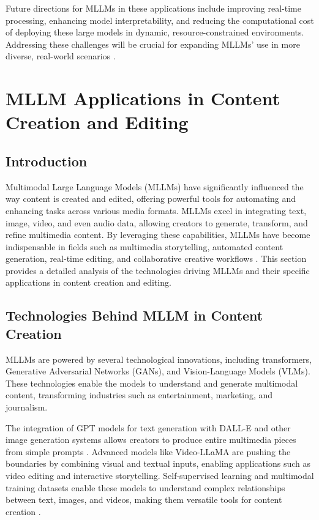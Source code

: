 \documentclass{article}
\begin{document}
Future directions for MLLMs in these applications include improving real-time processing, enhancing model interpretability, and reducing the computational cost of deploying these large models in dynamic, resource-constrained environments. Addressing these challenges will be crucial for expanding MLLMs' use in more diverse, real-world scenarios \cite{vs2024yang,vs2023chen}.

\section{MLLM Applications in Content Creation and Editing}

\subsection{Introduction}

Multimodal Large Language Models (MLLMs) have significantly influenced the way content is created and edited, offering powerful tools for automating and enhancing tasks across various media formats. MLLMs excel in integrating text, image, video, and even audio data, allowing creators to generate, transform, and refine multimedia content. By leveraging these capabilities, MLLMs have become indispensable in fields such as multimedia storytelling, automated content generation, real-time editing, and collaborative creative workflows \cite{vs2024chang,vs2017lauer}. This section provides a detailed analysis of the technologies driving MLLMs and their specific applications in content creation and editing.

\subsection{Technologies Behind MLLM in Content Creation}

MLLMs are powered by several technological innovations, including transformers, Generative Adversarial Networks (GANs), and Vision-Language Models (VLMs). These technologies enable the models to understand and generate multimodal content, transforming industries such as entertainment, marketing, and journalism. 

The integration of GPT models for text generation with DALL-E and other image generation systems allows creators to produce entire multimedia pieces from simple prompts \cite{vs2024chang}. Advanced models like Video-LLaMA are pushing the boundaries by combining visual and textual inputs, enabling applications such as video editing and interactive storytelling. Self-supervised learning and multimodal training datasets enable these models to understand complex relationships between text, images, and videos, making them versatile tools for content creation \cite{vs2024song}.
\end{document}
